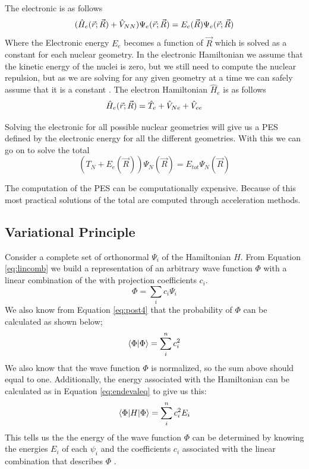 \documentclass[../master_thesis.tex]{subfiles}
\begin{document}
The electronic \SE is as follows
\begin{equation}
    (\hat{H}_e(\vec{r}; \vec{R}) + \hat{V}_{NN})\Psi_e(\vec{r};\vec{R}) = E_e(\vec{R})\Psi_e(\vec{r};\vec{R})
\end{equation}
Where the Electronic energy $E_e$ becomes a function of $\vec{R}$ which is solved as
a constant for each nuclear geometry. In the electronic Hamiltonian
we assume that the kinetic energy of the nuclei is zero, but we still need to
compute the nuclear repulsion, but as we are solving for any given geometry at a time
we can safely assume that it is a constant \cite{Cramer:2004}. The electron
Hamiltonian $\hat{H}_e$ is as follows
\begin{equation}\label{eq:elhamiltonian}
    \hat{H}_e(\vec{r}; \vec{R}) = \hat{T}_e + \hat{V}_{Ne} + \hat{V}_{ee}
\end{equation}

Solving the electronic \SE for all possible nuclear geometries will give us
a \ac{PES} defined by the electronic energy for all the different geometries.
With this we can go on to solve the total \SE \cite{Jensen:2017}
\begin{equation}
  (T_N + E_e(\vec{R}))\Psi_N(\vec{R}) = E_{tot}\Psi_N(\vec{R})
\end{equation}

The computation of the \ac{PES} can be computationally expensive. Because of this
most practical solutions of the total \SE are computed through acceleration
methods\cite{Jensen:2017}.


\subsection{Variational Principle}
Consider a complete set of orthonormal \eifuncs $ \Psi_i$  of the
Hamiltonian $H$. From Equation \ref{eq:lincomb} we build a representation of an
arbitrary wave function $\Phi$ with a linear combination of the \eifuncs with
projection coefficients $c_i$.
\begin{equation}
  \Phi = \sum\limits_ic_i\Psi_i
\end{equation}
We also know from Equation \ref{eq:post4} that the probability of $\Phi$ can
be calculated as shown below;
\begin{equation}
  \braket{\Phi|\Phi} = \sum\limits_i^nc_i^2
\end{equation}
We also know that the wave function $\Phi$ is normalized, so the sum above
should equal to one. Additionally, the energy associated with the Hamiltonian can
be calculated as in Equation \ref{eq:endevaleq} to give us this:
\begin{equation}
  \braket{\Phi|H|\Phi} = \sum\limits_i^nc_i^2E_i\label{eq:genenerg}
\end{equation}
This tells us the the energy of the wave function $\Phi$ can be determined by
knowing the energies $E_i$ of each \eifunc $\psi_i$ and the coefficients
$c_i$ associated with the linear combination that describes $\Phi$
\cite{Cramer:2004}.
\end{document}
